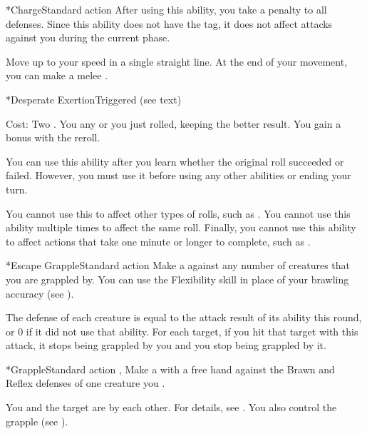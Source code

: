   \begin{activeability}*{Charge}{Standard action}
    \rankline
    After using this ability, you  take a  penalty to all defenses.
    Since this ability does not have the  tag, it does not affect attacks against you during the current phase.

    Move up to your speed in a single straight line.
    At the end of your movement, you can make a melee .
  \end{activeability}

  \begin{activeability}*{Desperate Exertion}{Triggered (see text)}
    \par \noindent Cost: Two .
    \rankline
    You  any  or  you just rolled, keeping the better result.
    You gain a  bonus with the reroll.

    You can use this ability after you learn whether the original roll succeeded or failed.
    However, you must use it before using any other abilities or ending your turn.

    You cannot use this to affect other types of rolls, such as .
    You cannot use this ability multiple times to affect the same roll.
    Finally, you cannot use this ability to affect actions that take one minute or longer to complete, such as .
  \end{activeability}

  \begin{activeability}*{Escape Grapple}{Standard action}
    \abilitytags {}
    \rankline
    Make a  against any number of creatures that you are grappled by.
    You can use the Flexibility skill in place of your brawling accuracy (see ).

    The defense of each creature is equal to the attack result of its  ability this round, or 0 if it did not use that ability.
    For each target, if you hit that target with this attack, it stops being grappled by you and you stop being grappled by it.
  \end{activeability}

  \begin{activeability}*{Grapple}{Standard action}
    \abilitytags {}, 
    \rankline
    Make a  with a free hand against the Brawn and Reflex defenses of one creature you .

    \hit You and the target are \grappled by each other.
    For details, see .
    \crit You also control the grapple (see ).
  \end{activeability}

